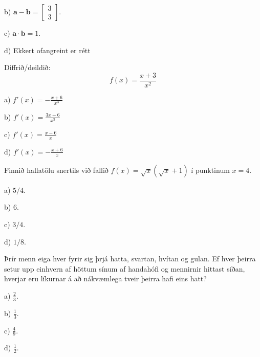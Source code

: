 b) $ \mathbf{a} - \mathbf{b} = \left[  \begin{matrix} 3 \\ 3 \end{matrix} \right] $.
 
c) $ \mathbf{a} \cdot \mathbf{b} = 1$.
 
d) Ekkert ofangreint er rétt

\item Diffrið/deildið: $$f(x)=\frac{x+3}{x^2}$$

a) \hspace{2mm} $\displaystyle f'(x)=-\frac{x+6}{x^3}$

b) \hspace{2mm} $\displaystyle f'(x)=\frac{3x+6}{x^3}$

c) \hspace{2mm} $\displaystyle f'(x)=\frac{x-6}{x}$

d) \hspace{2mm} $\displaystyle f'(x)=-\frac{x+6}{x}$

\item Finnið hallatölu snertils við fallið $f(x) = \sqrt x
\left( \sqrt{x} + 1\right)$ í punktinum $x=4$.

a) $5/4$.

b) $6$.

c) $3/4$.

d) $1/8$.

\item Þrír menn eiga hver fyrir sig þrjá hatta, svartan, hvítan og gulan. Ef hver þeirra setur upp einhvern af höttum sínum af handahófi og mennirnir hittast síðan, hverjar eru líkurnar á að nákvæmlega tveir þeirra hafi eins hatt?

a) $ \frac{2}{3}$.

b) $ \frac{1}{3}$.

c) $ \frac{4}{9}$.

d) $ \frac{1}{2}$.
